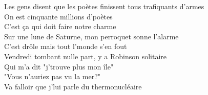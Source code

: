 Les gens disent que les poètes finissent tous trafiquants d'armes \\
On est cinquante millions d'poètes \\
C'est ça qui doit faire notre charme \\
Sur une lune de Saturne, mon perroquet sonne l'alarme \\
C'est drôle mais tout l'monde s'en fout \\

Vendredi tombant nulle part, y a Robinson solitaire \\
Qui m'a dit "j'trouve plus mon île" \\
"Vous n'auriez pas vu la mer?" \\
Va falloir que j'lui parle du thermonucléaire \\
